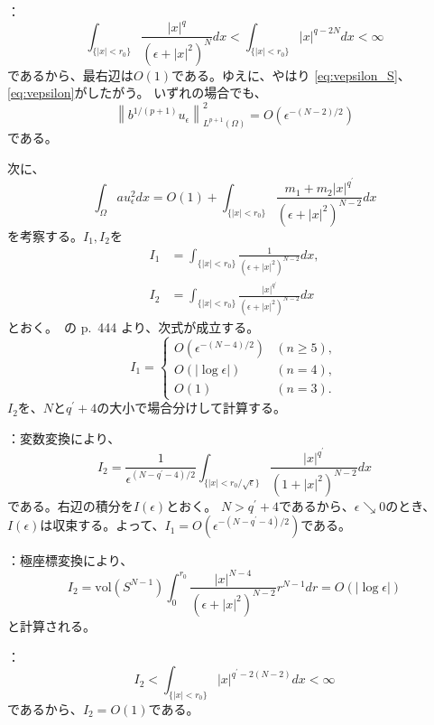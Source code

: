 ：
\[
 \int_{ \{ \lvert x \rvert < r_0 \} } 
 \frac{\lvert x \rvert^q}{(\epsilon + \lvert x
 \rvert^2)^N} dx < 
 \int_{ \{ \lvert x \rvert < r_0 \} } 
 \lvert x \rvert^{q-2N} dx < \infty
\]
であるから、最右辺は$O(1)$である。ゆえに、やはり
\eqref{eq:vepsilon_S}、
\eqref{eq:vepsilon}がしたがう。
いずれの場合でも、
\begin{equation}
 \left\| b^{1/(p+1)} u_\epsilon \right\|_{L^{p+1}(\Omega)}^2 = 
 O(\epsilon^{-(N-2)/2}) \label{eq:buepsilon}
\end{equation}
である。

次に、
\[
 \int_\Omega au_\epsilon^2 dx = O(1) + \int_{ \{ \lvert x \rvert <
 r_0 \} } \frac{m_1 + m_2 \lvert x \rvert^{q^\prime}}{(\epsilon +
 \lvert x \rvert^2)^{N-2}} dx 
\]
を考察する。$I_1, I_2$を
\begin{align*}
 I_1 &= 
 \int_{ \{ \lvert x \rvert <
 r_0 \} } \frac{1}{(\epsilon +
 \lvert x \rvert^2)^{N-2}} dx, \\
 I_2 &= 
 \int_{ \{ \lvert x \rvert <
 r_0 \} } \frac{ \lvert x \rvert^{q^\prime}}{(\epsilon +
 \lvert x \rvert^2)^{N-2}} dx
\end{align*}
とおく。\cite{MR709644}~の p.~444 より、次式が成立する。
\[
 I_1 = \begin{cases}
        O(\epsilon^{-(N-4)/2}) & (n \geq 5),\\
        O(\lvert \log \epsilon \rvert) & (n = 4), \\ 
        O(1) & (n = 3).
       \end{cases}
\]
$I_2$を、$N$と$q^\prime + 4$の大小で場合分けして計算する。

：変数変換により、
\[
 I_2 = \frac{1}{\epsilon^{(N-q^\prime - 4)/2}} \int_{ \{ \lvert x
 \rvert < r_0 / \sqrt{\epsilon}\}} 
 \frac{ \lvert x \rvert^{q^\prime}}{(1 +
 \lvert x \rvert^2)^{N-2}} dx
\]
である。右辺の積分を$I(\epsilon)$とおく。
$N > q^\prime + 4$であるから、$\epsilon \searrow 0$のとき、
$I(\epsilon)$は収束する。よって、$I_1 =
O(\epsilon^{-(N-q^\prime-4)/2})$である。

：極座標変換により、
\[
 I_2 = \mathrm{vol}(S^{N-1}) \int_0^{r_0} \frac{ \lvert x
 \rvert^{N-4}}{(\epsilon + \lvert x \rvert^2)^{N-2}} r^{N-1} dr =
 O(\lvert \log \epsilon \rvert)
\]
と計算される。

：
\[
 I_2 < \int_{ \{ \lvert x \rvert < r_0 \}} \lvert x \rvert^{q^\prime -
 2(N-2)} dx < \infty
\]
であるから、$I_2 = O(1)$である。

